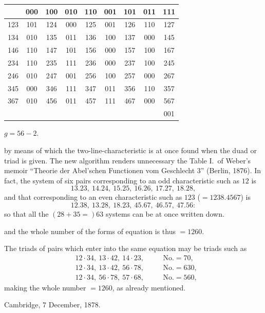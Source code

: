 \documentclass[11pt,a4paper]{book}
\begin{document}
\clearpage
\begin{center}
\begin{tabular}{c|cccccccc}
& 000 & 100 & 010 & 110 & 001 & 101 & 011 & 111 \\
\hline
123 & 101 & 124 & 000 & 125 & 001 & 126 & 110 & 127 \\
134 & 010 & 135 & 011 & 136 & 100 & 137 & 000 & 145 \\
146 & 110 & 147 & 101 & 156 & 000 & 157 & 100 & 167 \\
234 & 110 & 235 & 111 & 236 & 000 & 237 & 100 & 245 \\
246 & 010 & 247 & 001 & 256 & 100 & 257 & 000 & 267 \\
345 & 000 & 346 & 111 & 347 & 011 & 356 & 110 & 357 \\
367 & 010 & 456 & 011 & 457 & 111 & 467 & 000 & 567 \\
& & & & & & & & 001
\end{tabular}
\end{center}
$g = 56 - 2$.

\clearpage
by means of which the two-line-characteristic is at once found when the duad or triad is given. The new algorithm renders unnecessary the Table I.\ of Weber's memoir ``Theorie der Abel'schen Functionen vom Geschlecht 3'' (Berlin, 1876). In fact, the system of six pairs corresponding to an odd characteristic such as $12$ is
\[
13.23, \ 14.24, \ 15.25, \ 16.26, \ 17.27, \ 18.28,
\]
and that corresponding to an even characteristic such as $123$ ($= 1238.4567$) is
\[
12.38, \ 13.28, \ 18.23, \ 45.67, \ 46.57, \ 47.56:
\]
so that all the $(28 + 35 =) 63$ systems can be at once written down.

\clearpage
and the whole number of the forms of equation is thus $= 1260$.

The triads of pairs which enter into the same equation may be triads such as
\begin{align*}
& 12 \cdot 34, \ 13 \cdot 42, \ 14 \cdot 23, \quad && \text{No.} = 70, \\
& 12 \cdot 34, \ 13 \cdot 42, \ 56 \cdot 78, \quad && \text{No.} = 630, \\
& 12 \cdot 34, \ 56 \cdot 78, \ 57 \cdot 68, \quad && \text{No.} = 560,
\end{align*}
making the whole number $= 1260$, as already mentioned.

Cambridge, 7 December, 1878.

\clearpage
\end{document}
